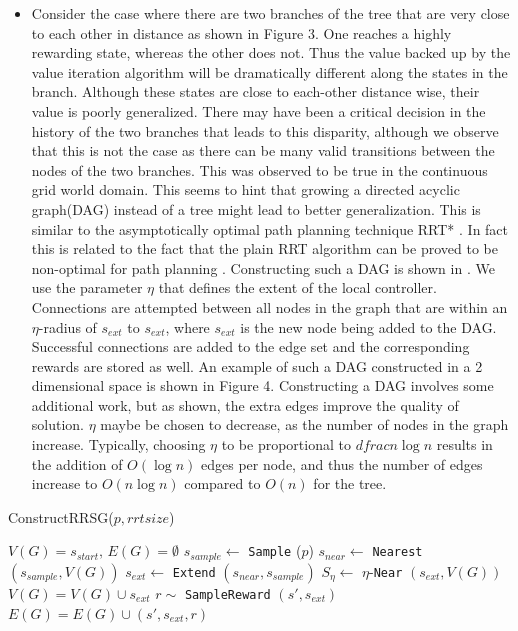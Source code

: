 \documentclass[wcp]{jmlr}
\begin{document}
\begin{itemize}
\item Consider the case where there are two branches of the tree that are very close to each other in distance as shown in Figure 3. One reaches a highly rewarding state, whereas the other does not. Thus the value backed up by the value iteration algorithm will be dramatically different along the states in the branch. Although these states are close to each-other distance wise, their value is poorly generalized. There may have been a critical decision in the history of the two branches that leads to this disparity, although we observe that this is not the case as there can be many valid transitions between the nodes of the two branches. This was observed to be true in the continuous grid world domain. This seems to hint that growing a directed acyclic graph(DAG) instead of a tree might lead to better generalization. This is similar to the asymptotically optimal path planning technique RRT* \citep{karaman}. In fact this is related to the fact that the plain RRT algorithm can be proved to be non-optimal for path planning \citep{karaman}. Constructing such a DAG is shown in . We use the parameter $\eta$ that defines the extent of the local controller. Connections are attempted between all nodes in the graph that are within an $\eta$-radius of $s_{ext}$ to $s_{ext}$, where $s_{ext}$ is the new node being added to the DAG. Successful connections are added to the edge set and the corresponding rewards are stored as well. An example of such a DAG constructed in a 2 dimensional space is shown in Figure 4. Constructing a DAG involves some additional work, but as shown, the extra edges improve the quality of solution. $\eta$ maybe be chosen to decrease, as the number of nodes in the graph increase. Typically, choosing $\eta$ to be proportional to $dfrac{n}{\log n}$ results in the addition of $O(\log n)$ edges per node, and thus the number of edges increase to $O(n\log n)$ compared to $O(n)$ for the tree. 

\end{itemize}

\begin{algorithm2e}
\caption{ConstructRRSG($p,rrtsize$)}
\label{alg:rrsg}
\dontprintsemicolon
$V(G)=s_{start},\,E(G)=\emptyset$\;
{
	$s_{sample} \leftarrow$ \texttt{Sample} ($p$)\;
	$s_{near} \leftarrow $ \texttt{Nearest} $(s_{sample},V(G))$\;
	$s_{ext} \leftarrow$ \texttt{Extend} $(s_{near},s_{sample})$\;
	$S_{\eta} \leftarrow$ $\eta$-\texttt{Near} $(s_{ext},V(G))$\;
	$V(G) = V(G) \cup s_{ext}$\;
	{		
		$r\sim$ \texttt{SampleReward} $(s',s_{ext})$\;
		$E(G) = E(G) \cup (s',s_{ext},r)$\;
	}
}
\end{algorithm2e}
\end{document}
